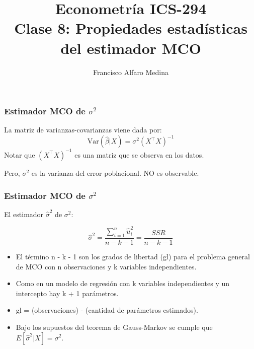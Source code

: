 \documentclass{beamer}
\title[ICS-162]{Econometría ICS-294\\ \small{Clase 8: Propiedades estadísticas del estimador MCO}}
\author{Francisco Alfaro Medina}
\institute[USM]
{Universidad Técnica Federico Santa María\\ %
	\medskip
	\textit{} %
	
}
\date{}
\begin{document}
	
\begin{frame}
	\titlepage %


\end{frame}
\logo{}






\begin{frame}
\frametitle{Estimador MCO de $\sigma^2$}
La matriz de varianzas-covarianzas viene dada por:
\[
\text{Var}(\hat{\beta}|X) = \sigma^2(X^{\top}X)^{-1}
\]
Notar que $(X^{\top}X)^{-1}$ es una matriz que se observa en los datos.

Pero, $\sigma^2$ es la varianza del error poblacional. NO es observable.

\end{frame}

\begin{frame}
\frametitle{Estimador MCO de $\sigma^2$}



El estimador $\hat{\sigma}^2$ de $\sigma^2$:

 $$\hat{\sigma}^2 = \frac{\sum_{i=1}^{n} \hat{u}_i^2 }{n-k-1}= \frac{SSR}{n - k - 1}$$


\begin{itemize}
    \item  El término n - k - 1  son los grados de libertad (gl) para el problema general de
MCO con n observaciones y k variables independientes.
\item  Como en un modelo de regresión con k variables independientes y un intercepto hay k + 1 parámetros.
\item gl =  (observaciones) - (cantidad de parámetros estimados).
\item  Bajo los supuestos del teorema de Gauss-Markov se cumple que $E[\hat{\sigma}^2|X] = \sigma^2$.
\end{itemize}

\end{frame}

    
\end{document}
